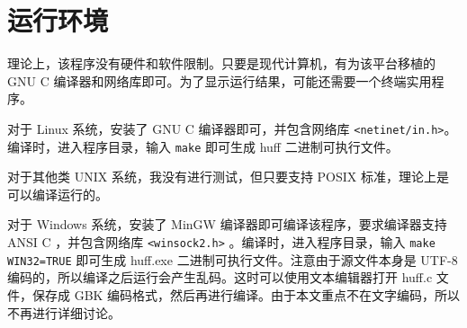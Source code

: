 \section{运行环境}
\label{runtime}

理论上，该程序没有硬件和软件限制。只要是现代计算机，有为该平台移植的 GNU C 编译器和网络库即可。为了显示运行结果，可能还需要一个终端实用程序。

对于 Linux 系统，安装了 GNU C 编译器即可，并包含网络库 \verb|<netinet/in.h>|。编译时，进入程序目录，输入 \verb|make| 即可生成 {\sf huff} 二进制可执行文件。

对于其他类 UNIX 系统，我没有进行测试，但只要支持 POSIX 标准，理论上是可以编译运行的。

对于 Windows 系统，安装了 MinGW 编译器即可编译该程序，要求编译器支持 ANSI C ，并包含网络库 \verb|<winsock2.h>| 。编译时，进入程序目录，输入 \verb|make WIN32=TRUE| 即可生成 {\sf huff.exe} 二进制可执行文件。注意由于源文件本身是 UTF-8 编码的，所以编译之后运行会产生乱码。这时可以使用文本编辑器打开 {\sf huff.c} 文件，保存成 GBK 编码格式，然后再进行编译。由于本文重点不在文字编码，所以不再进行详细讨论。
